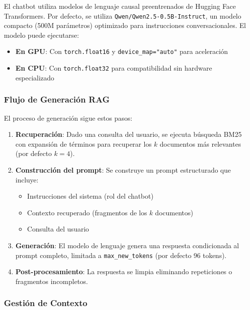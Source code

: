 El chatbot utiliza modelos de lenguaje causal preentrenados de Hugging Face Transformers. Por defecto, se utiliza \texttt{Qwen/Qwen2.5-0.5B-Instruct}, un modelo compacto (500M parámetros) optimizado para instrucciones conversacionales. El modelo puede ejecutarse:

\begin{itemize}
    \item \textbf{En GPU}: Con \texttt{torch.float16} y \texttt{device\_map="auto"} para aceleración
    \item \textbf{En CPU}: Con \texttt{torch.float32} para compatibilidad sin hardware especializado
\end{itemize}

\subsubsection{Flujo de Generación RAG}

El proceso de generación sigue estos pasos:

\begin{enumerate}
    \item \textbf{Recuperación}: Dado una consulta del usuario, se ejecuta búsqueda BM25 con expansión de términos para recuperar los $k$ documentos más relevantes (por defecto $k=4$).
    
    \item \textbf{Construcción del prompt}: Se construye un prompt estructurado que incluye:
    \begin{itemize}
        \item Instrucciones del sistema (rol del chatbot)
        \item Contexto recuperado (fragmentos de los $k$ documentos)
        \item Consulta del usuario
    \end{itemize}
    
    \item \textbf{Generación}: El modelo de lenguaje genera una respuesta condicionada al prompt completo, limitada a \texttt{max\_new\_tokens} (por defecto 96 tokens).
    
    \item \textbf{Post-procesamiento}: La respuesta se limpia eliminando repeticiones o fragmentos incompletos.
\end{enumerate}

\subsubsection{Gestión de Contexto}

